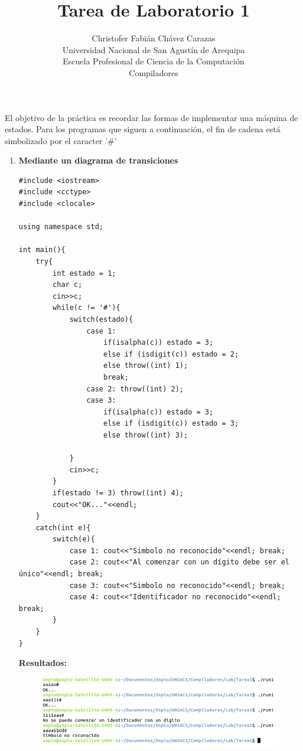 \documentclass[a4paper,12pt]{article}
\begin{document}
\title{Tarea de Laboratorio 1}
\author{
Christofer Fabián Chávez Carazas \\
\small{Universidad Nacional de San Agustín de Arequipa} \\
\small{Escuela Profesional de Ciencia de la Computación} \\
\small{Compiladores}
}
\date{}

\maketitle

El objetivo de la práctica es recordar las formas de implementar una máquina de estados. Para los programas que siguen a continuación,
el fin de cadena está simbolizado por el caracter '\#'

\begin{enumerate}
 \item \textbf{Mediante un diagrama de transiciones}
 
\begin{lstlisting}
#include <iostream>
#include <cctype>
#include <clocale>

using namespace std;

int main(){
	try{
		int estado = 1;
		char c;
		cin>>c;
		while(c != '#'){
			switch(estado){
				case 1: 
					if(isalpha(c)) estado = 3;
					else if (isdigit(c)) estado = 2;
					else throw((int) 1);
					break;
				case 2: throw((int) 2);
				case 3:
					if(isalpha(c)) estado = 3;
					else if (isdigit(c)) estado = 3;
					else throw((int) 3);

			}
			cin>>c;
		}
		if(estado != 3) throw((int) 4);
		cout<<"OK..."<<endl;
	}
	catch(int e){
		switch(e){
			case 1: cout<<"Simbolo no reconocido"<<endl; break;
			case 2: cout<<"Al comenzar con un dígito debe ser el único"<<endl; break;
			case 3: cout<<"Simbolo no reconocido"<<endl; break;
			case 4: cout<<"Identificador no reconocido"<<endl; break;
		}
	}
}
\end{lstlisting}

\textbf{Resultados:}

\begin{figure}[H]
 \centering
 \includegraphics[scale = 0.5]{1.png}
\end{figure}



\end{enumerate}
\end{document}
